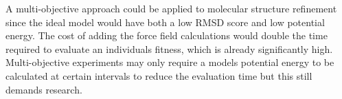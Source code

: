\documentclass[conference]{IEEEtran}
\begin{document}
A multi-objective approach could be applied to molecular structure refinement since the ideal model would have both a low RMSD score and low potential energy. The cost of adding the force field calculations would double the time required to evaluate an individuals fitness, which is already significantly high. Multi-objective experiments may only require a models potential energy to be calculated at certain intervals to reduce the evaluation time but this still demands research.



\end{document}
